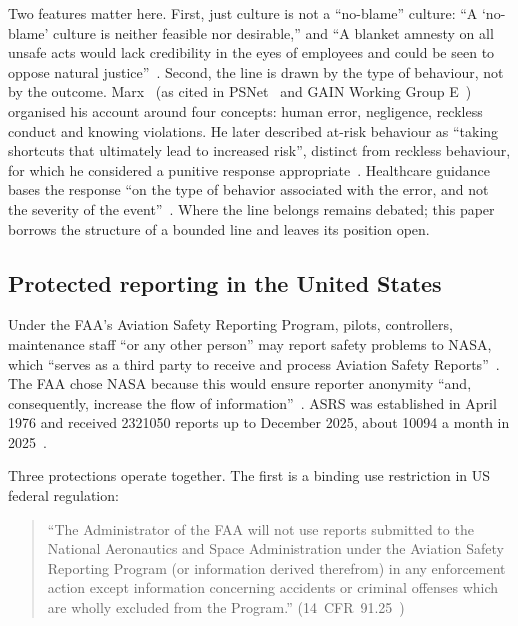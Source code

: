 \documentclass[review,12pt]{elsarticle}
\makeatletter
\renewcommand\paragraph{\@startsection{paragraph}{4}{\z@}{1.5ex \@plus .5ex \@minus .2ex}{-1em}{\normalfont\normalsize\bfseries}}
\makeatother
\begin{document}
Two features matter here. First, just culture is not a ``no-blame'' culture: ``A `no-blame' culture is neither feasible nor desirable,'' and ``A blanket amnesty on all unsafe acts would lack credibility in the eyes of employees and could be seen to oppose natural justice''~\cite[Sec.~1.4]{gain2004}. Second, the line is drawn by the type of behaviour, not by the outcome. Marx~\cite{marx2001} (as cited in PSNet~\cite{psnet_marx} and GAIN Working Group E~\cite[Sec.~2.3]{gain2004}) organised his account around four concepts: human error, negligence, reckless conduct and knowing violations. He later described at-risk behaviour as ``taking shortcuts that ultimately lead to increased risk'', distinct from reckless behaviour, for which he considered a punitive response appropriate~\cite{psnet2007}. Healthcare guidance bases the response ``on the type of behavior associated with the error, and not the severity of the event''~\cite{ucdavis2024}. Where the line belongs remains debated; this paper borrows the structure of a bounded line and leaves its position open.

\subsection{Protected reporting in the United States}\label{sec:us}

\paragraph{ASRS.} Under the FAA's Aviation Safety Reporting Program, pilots, controllers, maintenance staff ``or any other person'' may report safety problems to NASA, which ``serves as a third party to receive and process Aviation Safety Reports''~\cite[para.~1]{faa2021}. The FAA chose NASA because this would ensure reporter anonymity ``and, consequently, increase the flow of information''~\cite[para.~6.2]{faa2021}. ASRS was established in April 1976 and received \num{2321050} reports up to December 2025, about \num{10094} a month in 2025~\cite{nasaasrs}.

Three protections operate together. The first is a binding use restriction in US federal regulation:

\begin{quote}
``The Administrator of the FAA will not use reports submitted to the National Aeronautics and Space Administration under the Aviation Safety Reporting Program (or information derived therefrom) in any enforcement action except information concerning accidents or criminal offenses which are wholly excluded from the Program.'' (14~CFR~91.25~\cite{cfr9125})
\end{quote}
\end{document}
